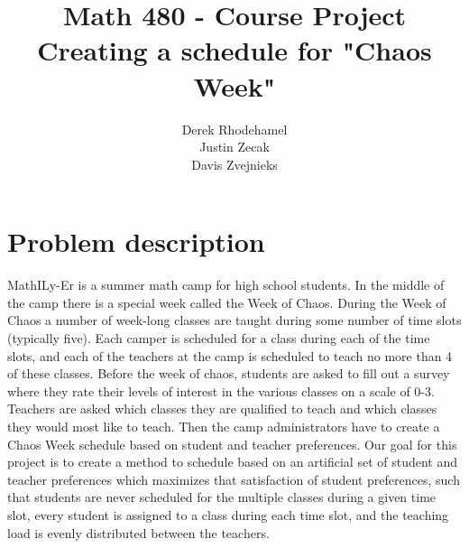 \documentclass[11pt]{article}
\title{\textbf{Math 480 - Course Project}
			  \\Creating a schedule for "Chaos Week"}
\author{Derek Rhodehamel\\
		Justin Zecak\\
		Davis Zvejnieks}
\date{}
\begin{document}
\maketitle

\section{Problem description}
MathILy-Er is a summer math camp for high school students.  In the middle of the camp there is a special week called the Week of Chaos.  During the Week of Chaos a number of week-long classes are taught during some number of time slots (typically five). Each camper is scheduled for a class during each of the time slots, and each of the teachers at the camp is scheduled to teach no more than 4 of these classes.  Before the week of chaos, students are asked to fill out a survey where they rate their levels of interest in the various classes on a scale of 0-3. Teachers are asked which classes they are qualified to teach and which classes they would most like to teach. Then the camp administrators have to create a Chaos Week schedule based on student and teacher preferences. Our goal for this project is to create a method to schedule based on an artificial set of student and teacher preferences which maximizes that satisfaction of student preferences, such that students are never scheduled for the multiple classes during a given time slot, every student is assigned to a class during each time slot, and the teaching load is evenly distributed between the teachers.
\end{document}
